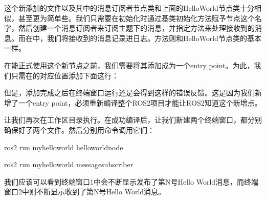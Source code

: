 \documentclass[letterpaper,10pt,english]{sphinxmanual}
\begin{document}
\sphinxAtStartPar
这个新添加的文件以及其中的消息订阅者节点类和上面的HelloWorld节点类十分相似，甚至更为简单些。我们只需要在初始化时通过基类初始化方法赋予节点这个名字，然后创建一个消息订阅者来订阅主题下的消息，并指定方法来处理接收到的消息。而在中，我们将接收到的消息记录进日志。方法则和HelloWorld节点类的基本一样。

\sphinxAtStartPar
在能正式使用这个新节点之前，我们需要将其添加成为一个entry
point。为此，我们只需在的对应位置添加下面这行：

\begin{sphinxVerbatim}[commandchars=\\\{\}]
\end{sphinxVerbatim}

\sphinxAtStartPar
但是，添加完成之后在终端窗口运行还是会得到这样的错误反馈。这是因为我们新增了一个entry
point，必须重新编译整个ROS2项目才能让ROS2知道这个新增点。

\sphinxAtStartPar
让我们再次在工作区目录执行。在成功编译后，让我们新建两个终端窗口，都分别确保好了两个文件。然后分别用命令调用它们：

\begin{sphinxVerbatim}[commandchars=\\\{\}]
ros2 run my\PYGZus{}hello\PYGZus{}world hello\PYGZus{}world\PYGZus{}node
\end{sphinxVerbatim}

\begin{sphinxVerbatim}[commandchars=\\\{\}]
ros2 run my\PYGZus{}hello\PYGZus{}world message\PYGZus{}subscriber
\end{sphinxVerbatim}

\sphinxAtStartPar
我们应该可以看到终端窗口1中会不断显示发布了第N号Hello
World消息，而终端窗口2中则不断显示收到了第N号Hello World消息。
\end{document}
